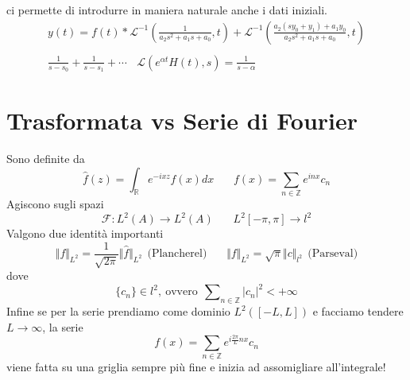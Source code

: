 \documentclass[10pt,a4paper,twoside]{book}
\begin{document}
ci permette di introdurre in maniera naturale anche i dati iniziali.
\begin{gather*}
y( t) =f( t) *\mathcal{L}^{-1}\left(\frac{1}{a_{2} s^{2} +a_{1} s+a_{0}} ,t\right) +\mathcal{L}^{-1}\left(\frac{a_{2}( sy_{0} +y_{1}) +a_{1} y_{0}}{a_{2} s^{2} +a_{1} s+a_{0}} ,t\right)\\
\\
\frac{1}{s-s_{0}} +\frac{1}{s-s_{1}} +\cdots \ \ \ \ \mathcal{L}\left( e^{\alpha t} H( t) ,s\right) =\frac{1}{s-\alpha }
\end{gather*}
\section{Trasformata vs Serie di Fourier}

Sono definite da
\begin{equation*}
\hat{f}( z) =\int _{\mathbb{R}} e^{-ixz} f( x) dx\ \ \ \ \ \ \ \ f( x) =\sum _{n\in \mathbb{Z}} e^{inx} c_{n}
\end{equation*}
Agiscono sugli spazi
\begin{equation*}
\mathcal{F} :L^{2}( A)\rightarrow L^{2}( A) \ \ \ \ \ \ \ \ L^{2}[ -\pi ,\pi ]\rightarrow l^{2}
\end{equation*}
Valgono due identità importanti
\begin{equation*}
\Vert f\Vert _{L^{2}} =\frac{1}{\sqrt{2\pi }}\Vert \hat{f}\Vert _{L^{2}} \ \ \text{(Plancherel)} \ \ \ \ \ \ \ \ \Vert f\Vert _{L^{2}} =\sqrt{\pi }\Vert c\Vert _{l^{2}} \ \ \text{(Parseval)}
\end{equation*}
dove
\begin{equation*}
\{c_{n}\} \in l^{2} ,\ \text{ovvero} \ \ \sum\nolimits _{n\in \mathbb{Z}}| c_{n}| ^{2} < +\infty 
\end{equation*}
Infine se per la serie prendiamo come dominio $L^{2}([ -L,L])$ e facciamo tendere $L\rightarrow \infty $, la serie
\begin{equation*}
f( x) =\sum _{n\in \mathbb{Z}} e^{i\frac{2\pi }{L} nx} c_{n}
\end{equation*}
viene fatta su una griglia sempre più fine e inizia ad assomigliare all'integrale!
\end{document}
